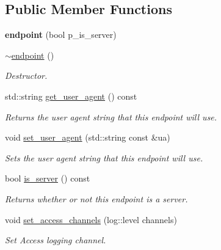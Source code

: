 \subsection*{Public Member Functions}
\begin{DoxyCompactItemize}
\item 
\mbox{\label{classwebsocketpp_1_1endpoint_a12015b0910fe39d0cbbd7fc7ea5ffcfd}} 
{\bfseries endpoint} (bool p\+\_\+is\+\_\+server)
\item 
\mbox{\label{classwebsocketpp_1_1endpoint_a4fea6c12eff3d5326d13731a08df2f9e}} 
\mbox{\hyperlink{classwebsocketpp_1_1endpoint_a4fea6c12eff3d5326d13731a08df2f9e}{$\sim$endpoint}} ()
\begin{DoxyCompactList}\small\item\em Destructor. \end{DoxyCompactList}\item 
std\+::string \mbox{\hyperlink{classwebsocketpp_1_1endpoint_a2a106056b019063573120c7a61472834}{get\+\_\+user\+\_\+agent}} () const
\begin{DoxyCompactList}\small\item\em Returns the user agent string that this endpoint will use. \end{DoxyCompactList}\item 
void \mbox{\hyperlink{classwebsocketpp_1_1endpoint_a06a703c52196d900d1e58b79d6657cc8}{set\+\_\+user\+\_\+agent}} (std\+::string const \&ua)
\begin{DoxyCompactList}\small\item\em Sets the user agent string that this endpoint will use. \end{DoxyCompactList}\item 
bool \mbox{\hyperlink{classwebsocketpp_1_1endpoint_a4f6a1e239250ef6c485865e2adf65b1b}{is\+\_\+server}} () const
\begin{DoxyCompactList}\small\item\em Returns whether or not this endpoint is a server. \end{DoxyCompactList}\item 
void \mbox{\hyperlink{classwebsocketpp_1_1endpoint_a5d7da609ebd2f797e5e67b6d050ebc59}{set\+\_\+access\+\_\+channels}} (log\+::level channels)
\begin{DoxyCompactList}\small\item\em Set Access logging channel. \end{DoxyCompactList}\item 

\end{DoxyCompactItemize}
